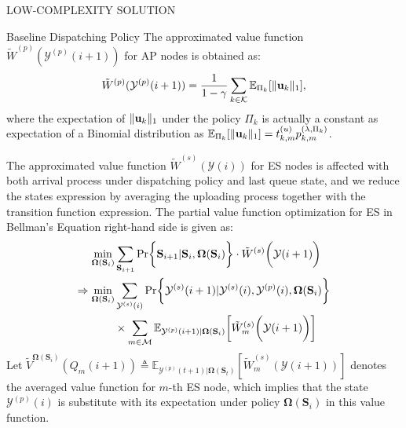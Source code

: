 \documentclass[10pt, conference, letterpaper]{IEEEtran}
\newcommand{\define}{\triangleq}
\newcommand{\leadto}{\Rightarrow}
\renewcommand{\vec}{\mathbf}
\DeclarePairedDelimiter{\set}{\{}{\}}
\DeclarePairedDelimiter{\Inorm}{\|}{\|_1}
\DeclarePairedDelimiter{\Paren}{\bigg(}{\bigg)}
\DeclarePairedDelimiter{\Bracket}{\bigg[}{\bigg]}
\DeclarePairedDelimiter{\Brace}{\bigg\{}{\bigg\}}
\newcommand{\apSet}{\mathcal{K}}
\newcommand{\esSet}{\mathcal{M}}
\newcommand{\Stat}{\mathbf{S}}
\newcommand{\Obsv}{\mathcal{Y}}
\newcommand{\Policy}{\mathbf{\Omega}}
\begin{document}
\begin{section}{LOW-COMPLEXITY SOLUTION}
\begin{subsection}{Baseline Dispatching Policy}
            The approximated value function $\tilde{W}^{(p)}(\Obsv^{(p)}(i+1))$ for AP nodes is obtained as:
            \begin{align}
                \tilde{W}^{(p)}(\Obsv^{(p)}(i+1))
                = \frac{1}{1-\gamma} \sum_{k\in\apSet} \mathbb{E}_{\Pi_k}[\Inorm{\vec{u}_k}],
            \end{align}
            where the expectation of $\Inorm{\vec{u}_k}$ under the policy $\Pi_k$ is actually a constant as expectation of a Binomial distribution as $\mathbb{E}_{\Pi_k}[\Inorm{\vec{u}_k}] = t^{(u)}_{k,m} p^{(\lambda, \Pi_k)}_{k,m}$.
            
            The approximated value function $\tilde{W}^{(s)}(\Obsv(i))$ for ES nodes is affected with both arrival process under dispatching policy and last queue state, and we reduce the states expression by averaging the uploading process together with the transition function expression.
            The partial value function optimization for ES in Bellman's Equation right-hand side is given as:
            \begin{align}
                \min_{\Policy(\Stat_i)}& \sum_{\Stat_{i+1}}
                    \Pr\Brace{\Stat_{i+1}|\Stat_{i}, \Policy(\Stat_i)} \cdot \tilde{W}^{(s)}\Paren{\Obsv(i+1)}
                \nonumber\\
                \leadto \min_{\Policy(\Stat_i)}& \sum_{\Obsv^{(s)}(i)}
                    \Pr\Brace{\Obsv^{(s)}(i+1)|\Obsv^{(s)}(i), \Obsv^{(p)}(i), \Policy(\Stat_i)}
                    \nonumber\\
                    & \times \sum_{m\in\esSet}
                        \mathbb{E}_{\Obsv^{(p)}(i+1)|\Policy(\Stat_i)}\Bracket{\tilde{W}^{(s)}_m\Paren{\Obsv(i+1)}}
            \end{align}
            Let $\tilde{V}^{\Policy(\Stat_i)}(Q_m(i+1)) \define \mathbb{E}_{\Obsv^{(p)}(t+1)|\Policy(\Stat_t)} [\tilde{W}^{(s)}_m(\Obsv(i+1))]$ denotes the averaged value function for $m$-th ES node, which implies that the state $\Obsv^{(p)}(i)$ is substitute with its expectation under policy $\Policy(\Stat_i)$ in this value function.


\end{subsection}
\end{section}
\end{document}
